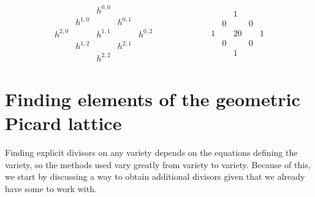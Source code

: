 \documentclass[12pt,twoside]{reedthesis}
\theoremstyle{plain}
\theoremstyle{definition}
\theoremstyle{remark}
\begin{document}
\[
\begin{matrix}
& & h^{0,0} & & \\
& h^{1,0} & & h^{0,1}&\\
h^{2,0} & &h^{1,1} & & h^{0,2}\\
& h^{1,2} & & h^{2,1} &\\
& & h^{2,2} & &
\end{matrix}
\hspace{1in}
\begin{matrix}
& & 1 & & \\
& 0 & & 0 &\\
1 & & 20 & & 1\\
& 0 & & 0 &\\
& & 1 & &
\end{matrix}
\]
\section{Finding elements of the geometric Picard lattice}
Finding explicit divisors on any variety depends on the equations defining the variety, so the methods used vary greatly from variety to variety. Because of this, we start by discussing a way to obtain  additional divisors given that we already have some to work with.
\end{document}
